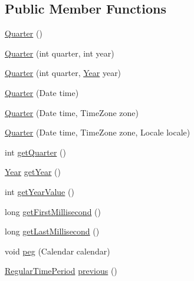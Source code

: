 \subsection*{Public Member Functions}
\begin{DoxyCompactItemize}
\item 
\mbox{\hyperlink{classorg_1_1jfree_1_1data_1_1time_1_1_quarter_a018ddfb9762c22a460ca04c6aa316d07}{Quarter}} ()
\item 
\mbox{\hyperlink{classorg_1_1jfree_1_1data_1_1time_1_1_quarter_ad1982d6803ea5cc139edb9f34b1cb58f}{Quarter}} (int quarter, int year)
\item 
\mbox{\hyperlink{classorg_1_1jfree_1_1data_1_1time_1_1_quarter_a4c9303ece8b128e07d02e90a79c01c55}{Quarter}} (int quarter, \mbox{\hyperlink{classorg_1_1jfree_1_1data_1_1time_1_1_year}{Year}} year)
\item 
\mbox{\hyperlink{classorg_1_1jfree_1_1data_1_1time_1_1_quarter_a8af8a0161d0caf630494f9772f592ec6}{Quarter}} (Date time)
\item 
\mbox{\hyperlink{classorg_1_1jfree_1_1data_1_1time_1_1_quarter_a75d24338919f6eb6b2a1dd893e4e1f9d}{Quarter}} (Date time, Time\+Zone zone)
\item 
\mbox{\hyperlink{classorg_1_1jfree_1_1data_1_1time_1_1_quarter_a75b8cfc895172a5b7ec3d8386dee6986}{Quarter}} (Date time, Time\+Zone zone, Locale locale)
\item 
int \mbox{\hyperlink{classorg_1_1jfree_1_1data_1_1time_1_1_quarter_a3e10df1d15ad5eb4afa7badf6d3e0bc2}{get\+Quarter}} ()
\item 
\mbox{\hyperlink{classorg_1_1jfree_1_1data_1_1time_1_1_year}{Year}} \mbox{\hyperlink{classorg_1_1jfree_1_1data_1_1time_1_1_quarter_aad21dbe3363f91d41840ba4b750af2e0}{get\+Year}} ()
\item 
int \mbox{\hyperlink{classorg_1_1jfree_1_1data_1_1time_1_1_quarter_a7fc49b916be40b1631cc3ce6568a9879}{get\+Year\+Value}} ()
\item 
long \mbox{\hyperlink{classorg_1_1jfree_1_1data_1_1time_1_1_quarter_a64b9346c7db660f54793093a3d496a7c}{get\+First\+Millisecond}} ()
\item 
long \mbox{\hyperlink{classorg_1_1jfree_1_1data_1_1time_1_1_quarter_afa9df1dbf9d13ab199ad78d6cc222f62}{get\+Last\+Millisecond}} ()
\item 
void \mbox{\hyperlink{classorg_1_1jfree_1_1data_1_1time_1_1_quarter_a4977c326e2990b40052d09d935f11ce8}{peg}} (Calendar calendar)
\item 
\mbox{\hyperlink{classorg_1_1jfree_1_1data_1_1time_1_1_regular_time_period}{Regular\+Time\+Period}} \mbox{\hyperlink{classorg_1_1jfree_1_1data_1_1time_1_1_quarter_a0ab654ab67dedb126e82c3330596f92e}{previous}} ()

\end{DoxyCompactItemize}
